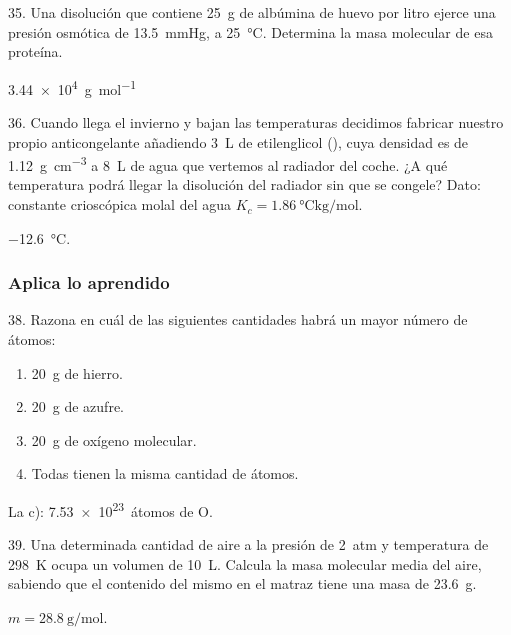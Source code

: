 \documentclass[10pt]{article}
\begin{document}
\begin{multicols}{2}
\begin{exercise}
  35. Una disolución que contiene \SI{25}{\gram} de albúmina de
  huevo por litro ejerce una presión osmótica de \SI{13.5}{\mmHg}, a
  \SI{25}{\celsius}. Determina la masa molecular de esa proteína.
\end{exercise}
\begin{solution}
  \SI{3.44e4}{\gram\per\mole}
\end{solution}

\begin{exercise}
  36. Cuando llega el invierno y bajan las temperaturas decidimos
  fabricar nuestro propio anticongelante añadiendo \SI{3}{\liter} de
  etilenglicol (), cuya densidad es de \SI{1.12}{\gram\per\cubic\centi\meter} a \SI{8}{\liter}
  de agua que vertemos al radiador del coche. ¿A qué temperatura
  podrá llegar la disolución del radiador sin que se congele?
  Dato: constante crioscópica molal del agua $K_c = \SI{1.86}{\celsius\kilo\gram\per\mole}$.
\end{exercise}
\begin{solution}
  \SI{-12.6}{\celsius}.
\end{solution}



\subsubsection{Aplica lo aprendido}

\begin{exercise}
  38. Razona en cuál de las siguientes cantidades habrá un mayor número de átomos:
  \begin{enumerate}
    \item \SI{20}{\gram} de hierro.
    \item \SI{20}{\gram} de azufre.
    \item \SI{20}{\gram} de oxígeno molecular.
    \item Todas tienen la misma cantidad de átomos.
  \end{enumerate}
\end{exercise}
\begin{solution}
  La c): \SI{7.53e23}{átomos} de O.
\end{solution}

\begin{exercise}
  39. Una determinada cantidad de aire a la presión de \SI{2}{atm} y
  temperatura de \SI{298}{\kelvin} ocupa un volumen de \SI{10}{\liter}. Calcula la masa molecular media del aire, sabiendo que el contenido del
  mismo en el matraz tiene una masa de \SI{23.6}{\gram}.
\end{exercise}
\begin{solution}
  $m = \SI{28.8}{\gram\per\mole}$.
\end{solution}


\end{multicols}
\end{document}
